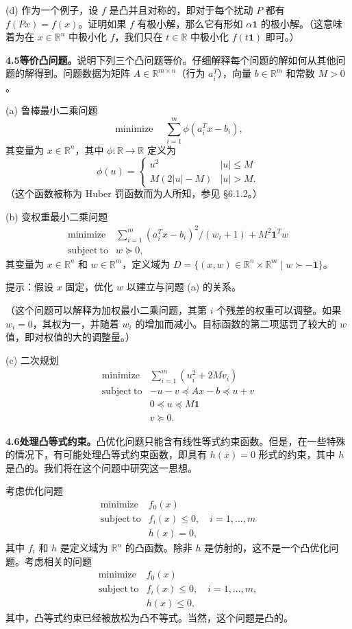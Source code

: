 \documentclass[UTF8,12pt,a4paper,fontset=fandol]{ctexart}
\begin{document}
(d) 作为一个例子，设 $f$ 是凸并且对称的，即对于每个扰动 $P$ 都有 $f(Px)=f(x)$。证明如果 $f$ 有极小解，那么它有形如 $\alpha\mathbf{1}$ 的极小解。（这意味着为在 $x\in\mathbb{R}^n$ 中极小化 $f$，我们只在 $t\in\mathbb{R}$ 中极小化 $f(t\mathbf{1})$ 即可。）

\noindent\textbf{4.5\quad 等价凸问题。}\quad 说明下列三个凸问题等价。仔细解释每个问题的解如何从其他问题的解得到。问题数据为矩阵 $A\in\mathbb{R}^{m\times n}$（行为 $a_i^T$），向量 $b\in\mathbb{R}^m$ 和常数 $M>0$。

(a) 鲁棒最小二乘问题
\[
\mathop{\mathrm{minimize}}\quad \sum_{i=1}^m\phi(a_i^Tx-b_i),
\]
其变量为 $x\in\mathbb{R}^n$，其中 $\phi:\mathbb{R}\to\mathbb{R}$ 定义为
\[
\phi(u)=
\begin{cases}
u^2 & |u|\leq M\\
M(2|u|-M) & |u|>M.
\end{cases}
\]
（这个函数被称为 Huber 罚函数而为人所知，参见 \S6.1.2。）

(b) 变权重最小二乘问题
\[
\begin{array}{ll}
\mathop{\mathrm{minimize}} & \displaystyle\sum_{i=1}^m(a_i^Tx-b_i)^2/(w_i+1)+M^2\mathbf{1}^Tw\\
\mathrm{subject\ to} & w\succeq0,
\end{array}
\]
其变量为 $x\in\mathbb{R}^n$ 和 $w\in\mathbb{R}^m$，定义域为 $D=\{(x,w)\in\mathbb{R}^n\times\mathbb{R}^m\mid w\succ-\mathbf{1}\}$。

提示：假设 $x$ 固定，优化 $w$ 以建立与问题 (a) 的关系。

（这个问题可以解释为加权最小二乘问题，其第 $i$ 个残差的权重可以调整。如果 $w_i=0$，其权为一，并随着 $w_i$ 的增加而减小。目标函数的第二项惩罚了较大的 $w$ 值，即对权值的大的调整量。）

(c) 二次规划
\[
\begin{array}{ll}
\mathop{\mathrm{minimize}} & \displaystyle\sum_{i=1}^m(u_i^2+2Mv_i)\\
\mathrm{subject\ to} & -u-v\preceq Ax-b\preceq u+v\\
& 0\preceq u\preceq M\mathbf{1}\\
& v\succeq0.
\end{array}
\]

\noindent\textbf{4.6\quad 处理凸等式约束。}\quad 凸优化问题只能含有线性等式约束函数。但是，在一些特殊的情况下，有可能处理凸等式约束函数，即具有 $h(x)=0$ 形式的约束，其中 $h$ 是凸的。我们将在这个问题中研究这一思想。

考虑优化问题
\[
\begin{array}{ll}
\mathop{\mathrm{minimize}} & f_0(x)\\
\mathrm{subject\ to} & f_i(x)\leq0,\quad i=1,\ldots,m\\
& h(x)=0,
\end{array}
\tag{4.65}
\]
其中 $f_i$ 和 $h$ 是定义域为 $\mathbb{R}^n$ 的凸函数。除非 $h$ 是仿射的，这不是一个凸优化问题。考虑相关的问题
\[
\begin{array}{ll}
\mathop{\mathrm{minimize}} & f_0(x)\\
\mathrm{subject\ to} & f_i(x)\leq0,\quad i=1,\ldots,m,\\
& h(x)\leq0,
\end{array}
\tag{4.66}
\]
其中，凸等式约束已经被放松为凸不等式。当然，这个问题是凸的。
\end{document}
